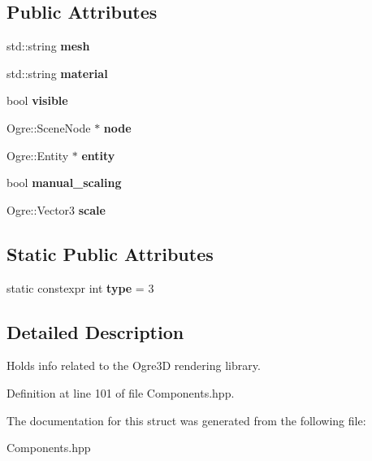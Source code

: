 \subsection*{Public Attributes}
\begin{DoxyCompactItemize}
\item 
std\+::string {\bfseries mesh}\hypertarget{struct_graphics_component_a68d12c02e16e0387acbfc233602a82fa}{}\label{struct_graphics_component_a68d12c02e16e0387acbfc233602a82fa}

\item 
std\+::string {\bfseries material}\hypertarget{struct_graphics_component_a99dec89d4c48b38777ae281458d64316}{}\label{struct_graphics_component_a99dec89d4c48b38777ae281458d64316}

\item 
bool {\bfseries visible}\hypertarget{struct_graphics_component_a1d0c6099159d9864b9447c659ab0a10d}{}\label{struct_graphics_component_a1d0c6099159d9864b9447c659ab0a10d}

\item 
Ogre\+::\+Scene\+Node $\ast$ {\bfseries node}\hypertarget{struct_graphics_component_a4dd94d81cb37863c49a62bea2d8b5288}{}\label{struct_graphics_component_a4dd94d81cb37863c49a62bea2d8b5288}

\item 
Ogre\+::\+Entity $\ast$ {\bfseries entity}\hypertarget{struct_graphics_component_a5e6159f802bae8f873860447549512d5}{}\label{struct_graphics_component_a5e6159f802bae8f873860447549512d5}

\item 
bool {\bfseries manual\+\_\+scaling}\hypertarget{struct_graphics_component_a14a0b1f834e4e4c95feeeabca31d2a93}{}\label{struct_graphics_component_a14a0b1f834e4e4c95feeeabca31d2a93}

\item 
Ogre\+::\+Vector3 {\bfseries scale}\hypertarget{struct_graphics_component_aeec41c43a81a91e2a36855f432fa51cb}{}\label{struct_graphics_component_aeec41c43a81a91e2a36855f432fa51cb}

\end{DoxyCompactItemize}
\subsection*{Static Public Attributes}
\begin{DoxyCompactItemize}
\item 
static constexpr int {\bfseries type} = 3\hypertarget{struct_graphics_component_a74c76950aef60a68476da3bf22d23604}{}\label{struct_graphics_component_a74c76950aef60a68476da3bf22d23604}

\end{DoxyCompactItemize}


\subsection{Detailed Description}
Holds info related to the Ogre3D rendering library. 

Definition at line 101 of file Components.\+hpp.



The documentation for this struct was generated from the following file\+:\begin{DoxyCompactItemize}
\item 
Components.\+hpp\end{DoxyCompactItemize}
